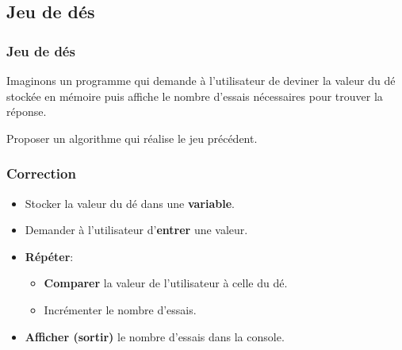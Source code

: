 \documentclass[svgnames,11pt]{beamer}
\begin{document}
\subsection{Jeu de dés}
\begin{frame}
    \frametitle{Jeu de dés}

    Imaginons un programme qui demande à l'utilisateur de deviner la valeur du dé stockée en mémoire puis affiche le nombre d'essais nécessaires pour trouver la réponse.

    \begin{activite}
        Proposer un algorithme qui réalise le jeu précédent.
    \end{activite}
\end{frame}
\begin{frame}
    \frametitle{Correction}

    \begin{itemize}
        \item Stocker la valeur du dé dans une \textbf{variable}.
        \item Demander à l'utilisateur d'\textbf{entrer} une valeur.
        \item \textbf{Répéter}:
              \begin{itemize}
                  \item \textbf{Comparer} la valeur de l'utilisateur à celle du dé.
                  \item Incrémenter le nombre d'essais.
              \end{itemize}
        \item \textbf{Afficher (sortir)} le nombre d'essais dans la console.
    \end{itemize}

\end{frame}
\end{document}
